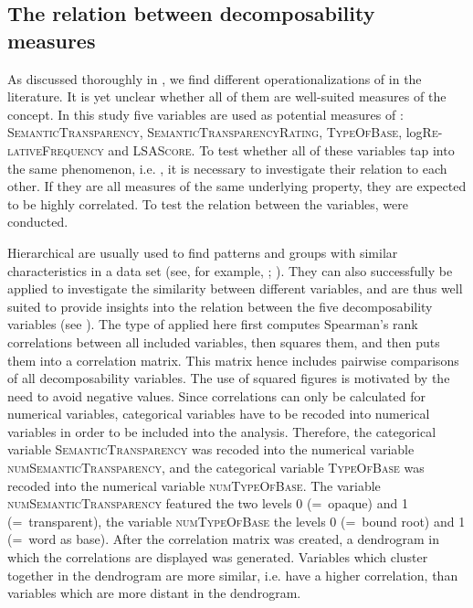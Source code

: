 \subsection{The relation between decomposability measures} \label{The Relation between Decomposability Measures}\largerpage
 


As discussed thoroughly in , we find different operationalizations of  in the literature. It is yet unclear whether all of them are well-suited measures of the concept. In this study five variables are used as potential measures of : \textsc{SemanticTransparency}, \textsc{SemanticTransparencyRating}, \textsc{TypeOfBase}, log\textsc{Re-lativeFrequency} and \textsc{LSAScore}.
To test whether all of these variables tap into the same phenomenon, i.e. , it is necessary to investigate their relation to each other. If they are all measures of the same underlying property, they are expected to be highly correlated. To test the relation between the variables,  were conducted. 

Hierarchical  are usually used to find patterns and groups with similar characteristics in a data  set (see, for example, \citealt[Chapter 5.1.5]{Baayen.2008}; \citealt[Chapter 8.1]{Zumel.2014}). They can also successfully be applied to investigate the similarity between different variables, and are thus well suited to provide insights into the relation between the five decomposability variables (see \citealt[200f.]{Baayen.2008}). 
The type of  applied here first computes Spearman's rank correlations between all included variables, then squares them, and then puts them into a correlation matrix. This matrix hence includes pairwise comparisons of all decomposability variables. The use of squared figures is motivated by the need to avoid negative values.
Since correlations can only be calculated for numerical variables,  categorical variables have to be recoded into numerical variables in order to be included into the analysis. 
Therefore, the categorical variable \textsc{SemanticTransparency}  was recoded into the numerical variable \textsc{numSemanticTransparency}, and the categorical variable \textsc{TypeOfBase} was recoded into the numerical variable \textsc{numTypeOfBase}.  The variable \textsc{numSemanticTransparency} featured  the two levels 0 (=~opaque) and 1 (=~transparent), the variable \textsc{numTypeOfBase} the levels 0 (=~bound root) and 1 (=~word as base). After the correlation matrix was created,  a dendrogram in which the correlations are displayed was generated. Variables which cluster together in the dendrogram are more similar, i.e. have a higher correlation, than variables which are more distant in the dendrogram. 

